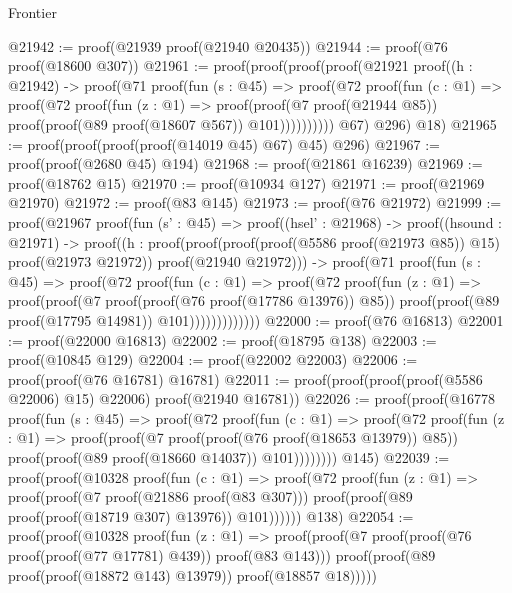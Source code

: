 \begin{lexlean}{Frontier}
\begin{coremodule}
@21942 := proof(@21939 proof(@21940 @20435))
@21944 := proof(@76 proof(@18600 @307))
@21961 := proof(proof(proof(proof(@21921
            proof((h : @21942) ->
              proof(@71
                  proof(fun (s : @45) =>
                    proof(@72
                        proof(fun (c : @1) =>
                          proof(@72
                              proof(fun (z : @1) =>
                                proof(proof(@7 proof(@21944 @85))
                                    proof(proof(@89 proof(@18607 @567)) @101))))))))))
          @67)
        @296)
      @18)
@21965 := proof(proof(proof(proof(@14019 @45) @67) @45) @296)
@21967 := proof(proof(@2680 @45) @194)
@21968 := proof(@21861 @16239)
@21969 := proof(@18762 @15)
@21970 := proof(@10934 @127)
@21971 := proof(@21969 @21970)
@21972 := proof(@83 @145)
@21973 := proof(@76 @21972)
@21999 := proof(@21967
      proof(fun (s' : @45) =>
        proof((hsel' : @21968) ->
          proof((hsound : @21971) ->
            proof((h : proof(proof(proof(proof(@5586 proof(@21973 @85)) @15) proof(@21973 @21972))
                  proof(@21940 @21972))) ->
              proof(@71
                  proof(fun (s : @45) =>
                    proof(@72
                        proof(fun (c : @1) =>
                          proof(@72
                              proof(fun (z : @1) =>
                                proof(proof(@7 proof(proof(@76 proof(@17786 @13976)) @85))
                                    proof(proof(@89 proof(@17795 @14981)) @101)))))))))))))
@22000 := proof(@76 @16813)
@22001 := proof(@22000 @16813)
@22002 := proof(@18795 @138)
@22003 := proof(@10845 @129)
@22004 := proof(@22002 @22003)
@22006 := proof(proof(@76 @16781) @16781)
@22011 := proof(proof(proof(proof(@5586 @22006) @15) @22006) proof(@21940 @16781))
@22026 := proof(proof(@16778
        proof(fun (s : @45) =>
          proof(@72
              proof(fun (c : @1) =>
                proof(@72
                    proof(fun (z : @1) =>
                      proof(proof(@7 proof(proof(@76 proof(@18653 @13979)) @85))
                          proof(proof(@89 proof(@18660 @14037)) @101))))))))
      @145)
@22039 := proof(proof(@10328
        proof(fun (c : @1) =>
          proof(@72
              proof(fun (z : @1) =>
                proof(proof(@7 proof(@21886 proof(@83 @307)))
                    proof(proof(@89 proof(proof(@18719 @307) @13976)) @101))))))
      @138)
@22054 := proof(proof(@10328
        proof(fun (z : @1) =>
          proof(proof(@7 proof(proof(@76 proof(proof(@77 @17781) @439)) proof(@83 @143)))
              proof(proof(@89 proof(proof(@18872 @143) @13979)) proof(@18857 @18)))))

\end{coremodule}
\end{lexlean}
